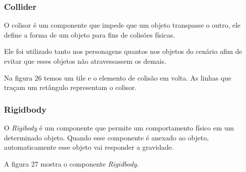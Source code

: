 \subsubsection{Collider}
O colisor é um componente que impede que um objeto transpasse o outro, ele define a forma de um objeto para fins de colisões físicas.

Ele foi utilizado tanto nos personagens quantos nos objetos do cenário afim de evitar que esses objetos não atravessassem os demais.

Na figura 26 temos um tile e o elemento de colisão em volta. As linhas que traçam um retângulo representam o colisor.

	\begin{figure}[h!]
		\centering
	\end{figure}



\subsubsection{Rigidbody}
O \textit{Rigibody} é um componente que permite um comportamento físico em um determinado objeto. Quando esse componente é anexado ao objeto, automaticamente esse objeto vai responder a gravidade.

A figura 27 mostra o componente \textit{Rigidbody}.
	
	\begin{figure}[h!]
		\centering
	\end{figure}


